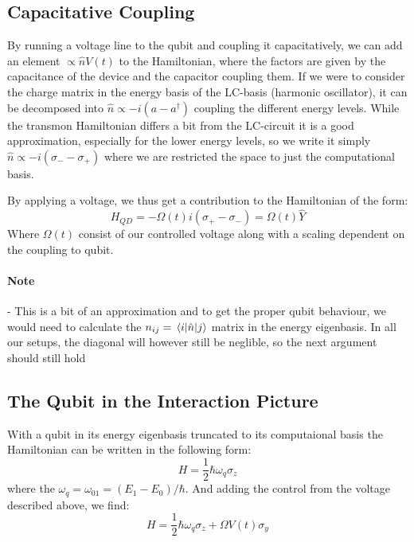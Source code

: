 \subsection{Capacitative Coupling}
By running a voltage line to the qubit and coupling it capacitatively, we can add an element $\propto \hat{n}V(t)$ to the Hamiltonian, where the factors are given by the capacitance of the device and the capacitor coupling them.  If we were to consider the charge matrix in the energy basis of the LC-basis (harmonic oscillator), it can be decomposed into $\hat{n} \propto -i(a - a^\dagger)$ coupling the different energy levels. While the transmon Hamiltonian differs a bit from the LC-circuit it is a good approximation, especially for the lower energy levels, so we write it simply $\hat{n} \propto -i (\sigma_- - \sigma_+)$ where we are restricted the space to just the computational basis.

By applying a voltage, we thus get a contribution to the Hamiltonian of the form:
\begin{equation}
    H_{QD} = - \Omega(t) i \left(\sigma_+ - \sigma_- \right) = \Omega(t) \hat{Y}
\end{equation}
Where $\Omega(t)$ consist of our controlled voltage along with a scaling dependent on the coupling to qubit.  

\paragraph{Note} - This is a bit of an approximation and to get the proper qubit behaviour, we would need to calculate the $n_{ij} = \mel{i}{\hat{n}}{j}$ matrix in the energy eigenbasis. In all our setups, the diagonal will however still be neglible, so the next argument should still hold 

\subsection{The Qubit in the Interaction Picture}
With a qubit in its energy eigenbasis truncated to its computaional basis the Hamiltonian can be written in the following form:
\begin{equation}
    H = \frac{1}{2} \hbar \omega_{q} \sigma_z
\end{equation}
where the $\omega_q = \omega_{01} = (E_1 - E_0) / \hbar$. And adding the control from the voltage described above, we find:
\begin{equation}
    H = \frac{1}{2} \hbar \omega_{q} \sigma_z + \Omega V(t) \sigma_y
\end{equation} 

